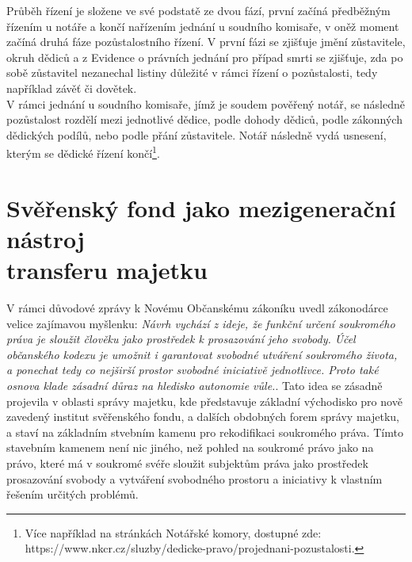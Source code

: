 \documentclass{article}
\begin{document}
Průběh řízení je složene ve své podstatě ze dvou fází, první začíná předběžným řízením u notáře a končí nařízením jednání u soudního komisaře, v oněž moment začíná druhá fáze pozůstalostního řízení. V první fázi se zjišťuje jmění zůstavitele, okruh dědiců a z Evidence o právních jednání pro případ smrti se zjišťuje, zda po sobě zůstavitel nezanechal listiny důležité v rámci řízení o pozůstalosti, tedy například závěť či dovětek.\\

V rámci jednání u soudního komisaře, jímž je soudem pověřený notář, se následně pozůstalost rozdělí mezi jednotlivé dědice, podle dohody dědiců, podle zákonných dědických podílů, nebo podle přání zůstavitele. Notář následně vydá usnesení, kterým se dědické řízení končí\footnote{Více například na stránkách Notářské komory, dostupné zde: https://www.nkcr.cz/sluzby/dedicke-pravo/projednani-pozustalosti.}.\\


\newpage
\thispagestyle{smallertextinheader}

\section[Svěřenský fond jako mezigenerační nástroj transferu majetku]{Svěřenský fond jako mezigenerační nástroj\\ transferu majetku}

V rámci důvodové zprávy k Novému Občanskému zákoníku uvedl zákonodárce velice zajímavou myšlenku: \textit{Návrh vychází z ideje, že funkční určení soukromého práva je sloužit člověku jako prostředek k prosazování jeho svobody. Účel občanského kodexu je umožnit i garantovat svobodné utváření soukromého života, a ponechat tedy co nejširší prostor svobodné iniciativě jednotlivce. Proto také osnova klade zásadní důraz na hledisko autonomie vůle.}. Tato idea se zásadně projevila v oblasti správy majetku, kde představuje základní východisko pro nově zavedený institut svěřenského fondu, a dalších obdobných forem správy majetku, a staví na základním stvebním kamenu pro rekodifikaci soukromého práva. Tímto stavebním kamenem není nic jiného, než pohled na soukromé právo jako na právo, které má v soukromé svéře sloužit subjektům práva jako prostředek prosazování svobody a vytváření svobodného prostoru a iniciativy k vlastním řešením určitých problémů.\\
\end{document}
